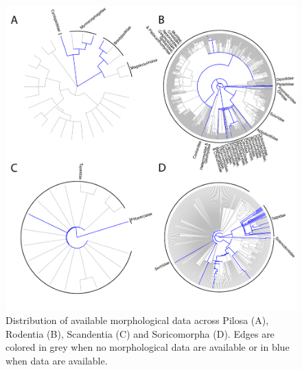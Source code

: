 \begin{figure}[!ht]
\centering
    \includegraphics[width=\textwidth]{Supplementaries/Figures/MissingMammals/Combined_phy3.pdf}
\caption[Available data in Pilosa, Rodentia, Scandentia and Soricomorpha]{Distribution of available morphological data across Pilosa (A), Rodentia (B), Scandentia (C) and Soricomorpha (D). Edges are colored in grey when no morphological data are available or in blue when data are available.}
\label{Supp_combined_phy3}
\end{figure}



